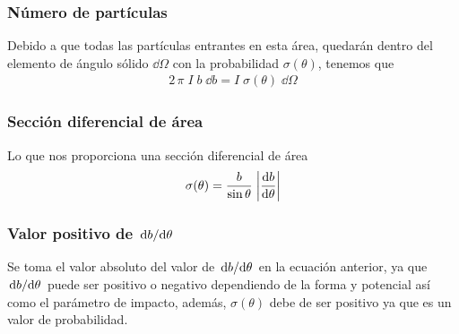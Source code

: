 \begin{frame}
\frametitle{Número de partículas}
Debido a que todas las partículas entrantes en esta área, quedarán dentro del elemento de ángulo sólido $\dd{\Omega}$ con la probabilidad $\sigma(\theta)$, tenemos que
\begin{align*}
2 \, \pi \; I \; b \; \dd{b} = I \; \sigma(\theta) \; \dd{\Omega}
\end{align*}
\end{frame}
\begin{frame}
\frametitle{Sección diferencial de área}
Lo que nos proporciona una sección diferencial de área
\begin{align}
\sigma(\theta) = \dfrac{b}{\sin \theta} \; \abs{\dv{b}{\theta}}
\label{eq:sigma_theta}
\end{align}
\end{frame}
\begin{frame}
\frametitle{Valor positivo de $\dv*{b}{\theta}$}
Se toma el valor absoluto del valor de $\dv*{b}{\theta}$ en la ecuación anterior, ya que $\dv*{b}{\theta}$ puede ser positivo o negativo dependiendo de la forma y potencial así como el parámetro de impacto, además, $\sigma(\theta)$ debe de ser positivo ya que es un valor de probabilidad.
\end{frame}
